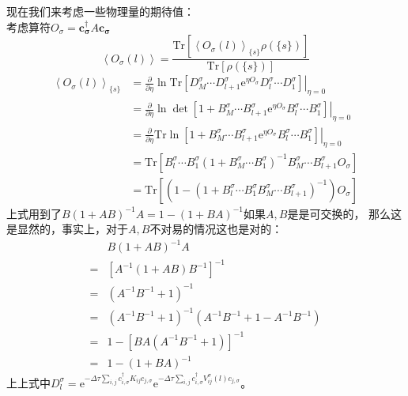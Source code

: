 \documentclass[UTF8,cs4size]{ctexart}
\def\ee{\mathrm e}
\begin{document}
现在我们来考虑一些物理量的期待值：\\
考虑算符$O_\sigma=\mathbf{c^{\dag}_{\sigma}} A \mathbf{c_{\sigma}}$
\[
    \left< O_\sigma(l) \right> = \frac{ \mathrm{Tr}[ \left< O_\sigma (l) \right>_{\{s\}} \rho(\{s\})]}
    {\mathrm{Tr}[ \rho(\{s\})]} 
\]
\[
    \begin{aligned}
        \left< O_\sigma (l) \right>_{\{s\}} &=
        \frac{\partial}{\partial \eta} \ln \mathrm{Tr} \left.\left[D_{M}^{\sigma} \cdots D_{l+1}^{\sigma} 
        \ee^{\eta O_\sigma} D_{l}^{\sigma} \cdots D_{1}^{\sigma} \right] 
        \right|_{\eta=0}\\
        &=  \frac{\partial}{\partial \eta} \ln \det \left. \left[1+B_{M}^{\sigma} \cdots B_{l+1}^{\sigma} 
        \ee^{\eta O_\sigma} B_{l}^{\sigma} \cdots B_{1}^{\sigma} \right] \right|_{\eta=0}\\
        &=  \frac{\partial}{\partial \eta} \mathrm{Tr} \ln \left. \left[1+B_{M}^{\sigma} \cdots B_{l+1}^{\sigma} 
        \ee^{\eta O_\sigma} B_{l}^{\sigma} \cdots B_{1}^{\sigma} \right] \right|_{\eta=0}\\
        &=\mathrm{Tr} \left[B_{l}^{\sigma} \cdots B_{1}^{\sigma} \left(
        1+B_{M}^{\sigma} \cdots  B_{1}^{\sigma}\right)^{-1} B_{M}^{\sigma} \cdots B_{l+1}^{\sigma} O_\sigma
        \right]\\
        &=\mathrm{Tr} \left[\left(1- \left(1+B_{l}^{\sigma} \cdots B_{1}^{\sigma}
        B_{M}^{\sigma} \cdots  B_{l+1}^{\sigma} \right)^{-1} \right) O_\sigma\right]
    \end{aligned}    
\]
上式用到了$B\left( 1 + A B \right)^{-1} A = 1 - \left( 1+ B A \right)^{-1}$如果$A,B$是是可交换的，
那么这是显然的，事实上，对于$A,B$不对易的情况这也是对的：
\[
    \begin{aligned}
          &B\left( 1 + A B \right)^{-1} A  \\ 
        = &\left[ A^{-1} \left( 1 + A B \right) B^{-1} \right] ^{-1} \\
        = &\left( A^{-1} B^{-1} + 1 \right)^{-1} \\
        = &\left( A^{-1} B^{-1} + 1 \right)^{-1}
            \left(A^{-1} B^{-1} + 1  - A^{-1} B^{-1} \right) \\
        = &1 - \left[ BA\left( A^{-1} B^{-1} + 1 \right) \right]^{-1} \\
        = &1 - \left( 1 + BA\right)^{-1}
    \end{aligned}
\]
上上式中$D_{l}^{\sigma}=\ee^{-\Delta \tau \sum_{i,j} c^{\dag}_{i,\sigma} K_{ij} c_{j,\sigma}}
\ee^{-\Delta \tau \sum_{i,j} c^{\dag}_{i,\sigma} V^{\sigma}_{ij}(l) c_{j,\sigma}}$。
\end{document}
